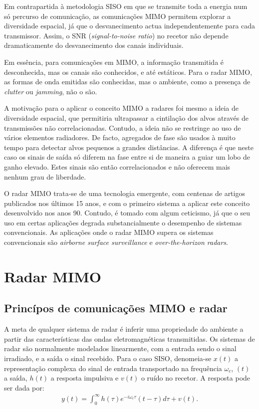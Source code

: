\documentclass[purist,portuguese]{ist-report}
\begin{document}
Em contrapartida à metodologia SISO em que se transmite toda a energia num só percurso de comunicação, as comunicações MIMO permitem explorar a diversidade espacial, já que o desvanecimento actua independentemente para cada transmissor.
Assim, o SNR (\textit{signal-to-noise ratio}) no recetor não depende dramaticamente do desvanecimento dos canais individuais.

Em essência, para comunicações em MIMO, a informação transmitida é desconhecida, mas os canais são conhecidos, e até estáticos. Para o radar MIMO, as formas de onda emitidas são conhecidas, mas o ambiente, como a presença de \textit{clutter} ou \textit{jamming}, não o são.

A motivação para o aplicar o conceito MIMO a radares foi mesmo a ideia de diversidade espacial, que permitiria ultrapassar a cintilação dos alvos através de transmissões não correlacionadas.
Contudo, a ideia não se restringe ao uso de vários elementos radiadores.
De facto, agregados de fase  são usados à muito tempo para detectar alvos pequenos a grandes distâncias.
A diferença é que neste caso os sinais de saída só diferem na fase entre si de maneira a guiar um lobo de ganho elevado. 
Estes sinais são então correlacionados e não oferecem mais nenhum grau de liberdade.


O radar MIMO trata-se de uma tecnologia emergente, com centenas de artigos publicados nos últimos 15 anos, e com o primeiro sistema a aplicar este conceito desenvolvido nos anos 90.
Contudo, é tomado com algum ceticismo, já que o seu uso em certas aplicações degrada substancialmente o desempenho de sistemas convencionais.
As aplicações onde o radar MIMO supera os sistemas convencionais são \textit{airborne surface surveillance} e \textit{over-the-horizon radars}.


\section{Radar MIMO}

\subsection{Princípos de comunicações MIMO e radar}

A meta de qualquer sistema de radar é inferir uma propriedade do ambiente a partir das características das ondas eletromagnéticas transmitidas.
Os sistemas de radar são normalmente modelados linearmente, com a entrada sendo o sinal irradiado, e a saída o sinal recebido. 
Para o caso SISO, denomeia-se $x(t)$ a representação complexa do sinal de entrada transportado na frequência $\omega_c$, $(t)$ a saída, $h(t)$ a resposta impulsiva e $v(t)$ o ruído no recetor.
A resposta pode ser dada por:
\begin{align}
  y(t) = \int_0^\infty h(\tau)e^{-i\omega_c\tau}(t-\tau)d\tau + v(t).
  \label{eq:linearsiso}
\end{align}
\end{document}
